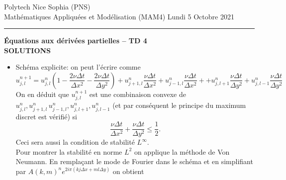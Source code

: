 \documentclass[12pt,a4paper]{article}
\begin{document}
 \hfill Polytech Nice Sophia (PNS)\\
\noindent Math\'ematiques Appliqu\'ees et Mod\'elisation (MAM4) \hfill Lundi 5 Octobre 2021 \\

\hrule

\bigskip
\bigskip

\begin{center}{\bf \'Equations aux d\'eriv\'ees partielles --
TD 4\\ SOLUTIONS}\end{center}

\bigskip

\begin{itemize}
\item Schéma explicite: on peut l'écrire comme
$$
u_{j,l}^{n+1} =u_{j,l}^n \left(1-\frac{2\nu\Delta t}{\Delta x^2}  - \frac{2\nu\Delta t}{\Delta y^2} \right) +u_{j+1,l}^{n}\frac{\nu\Delta t}{\Delta x^2}  + u_{j-1,l}^{n}\frac{\nu\Delta t}{\Delta x^2}++u_{j,l+1}^{n}\frac{\nu\Delta t}{\Delta y^2}  + u_{j,l-1}^{n}\frac{\nu\Delta t}{\Delta y^2}
$$
On en déduit que $u_{j,l}^{n+1}$ est une combinaison convexe de $u_{j,l}^n,u_{j+1,l}^{n}\,u_{j-1,l}^{n},u_{j,l+1}^{n},u_{j,l-1}^{n}$ (et par conséquent le principe du maximum discret est vérifié) si
$$
\frac{\nu\Delta t}{\Delta x^2}  + \frac{\nu\Delta t}{\Delta y^2} \le \frac{1}{2}.
$$
Ceci sera aussi la condition de stabilité $L^{\infty}$.\\
Pour montrer la stabilité en norme $L^2$ on applique la méthode de Von Neumann. En remplaçant le mode de Fourier dans le schéma et en simplifiant par $A(k,m)^ne^{2i\pi(kj\Delta x +ml\Delta y)}$ on obtient


\end{itemize}
\end{document}
